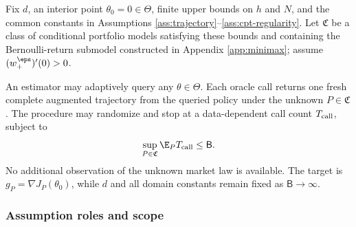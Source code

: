 \begin{assumption}\label{ass:minimax-oracle}
Fix $d$, an interior point $\theta_0=0\in\Theta$, finite upper bounds on $h$ and $N$, and the common constants in Assumptions \ref{ass:trajectory}--\ref{ass:cpt-regularity}.  Let $\mathfrak C$ be a class of conditional portfolio models satisfying these bounds and containing the Bernoulli-return submodel constructed in Appendix \ref{app:minimax}; assume $(w_+^\eps)'(0)>0$.

An estimator may adaptively query any $\theta\in\Theta$.  Each oracle call returns one fresh complete augmented trajectory from the queried policy under the unknown $P\in\mathfrak C$.  The procedure may randomize and stop at a data-dependent call count $T_{\rm call}$, subject to
\begin{equation}\label{eq:minimax-budget}
 \sup_{P\in\mathfrak C}\E_P T_{\rm call}\le \mathsf B.
\end{equation}
No additional observation of the unknown market law is available.  The target is $g_P=\nabla J_P(\theta_0)$, while $d$ and all domain constants remain fixed as $\mathsf B\to\infty$.
\end{assumption}

\subsubsection{Assumption roles and scope}

